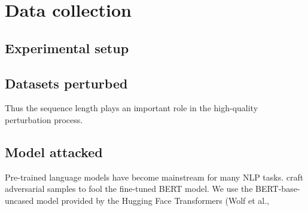 \section{Data collection}\label{sec:data-collection}

\subsection{Experimental setup}\label{subsec:experimental-setup}


\subsection{Datasets perturbed}\label{subsec:datasets-perturbed}
Thus the sequence length plays an important role in the high-quality perturbation process. 


\subsection{Model attacked}\label{subsec:model-attacked}

Pre-trained language models have become mainstream for many NLP tasks.
craft adversarial samples to fool the fine-tuned BERT model.
We use the BERT-base-uncased model provided by the Hugging Face Transformers (Wolf et al.,

